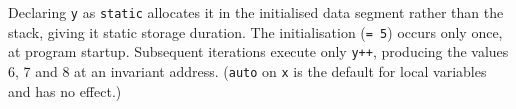 
Declaring \texttt{y} as \texttt{static} allocates it in the initialised data
segment rather than the stack, giving it static storage duration. The
initialisation (\texttt{= 5}) occurs only once, at program startup. Subsequent
iterations execute only \texttt{y++}, producing the values 6, 7 and 8 at an
invariant address. (\texttt{auto} on \texttt{x} is the default for local
variables and has no effect.)
